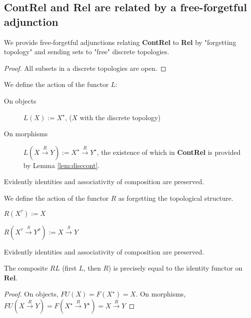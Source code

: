 \begin{fullwidth}
\subsection{\textbf{ContRel} and \textbf{Rel} are related by a free-forgetful adjunction}

We provide free-forgetful adjunctions relating \textbf{ContRel} to \textbf{Rel} by "forgetting topology" and sending sets to "free" discrete topologies.


\begin{lemma}\label{lem:disccont}
\begin{proof}
All subsets in a discrete topologies are open.
\end{proof}
\end{lemma}

\begin{defn} We define the action of the functor $L$:
\begin{description}
\item[On objects] $L(X) := X^\star$, ($X$ with the discrete topology)
\item[On morphisms] $L(X \overset{R}{\rightarrow} Y) := X^\star \overset{R}{\rightarrow} Y^\star$, the existence of which in \textbf{ContRel} is provided by Lemma \ref{lem:disccont}.
\end{description}
Evidently identities and associativity of composition are preserved.
\end{defn}

\begin{defn}
\begin{description} We define the action of the functor $R$ as forgetting the topological structure.
\item[On objects] $R(X^\tau) := X$
\item[On morphisms] $R(X^\tau \overset{S}{\rightarrow} Y^\sigma) := X \overset{S}{\rightarrow} Y$
\end{description}
Evidently identities and associativity of composition are preserved.
\end{defn}


\begin{lemma}[$RL = 1_{\textbf{Rel}}$]\label{lem:idadj}
The composite $RL$ (first $L$, then $R$) is precisely equal to the identity functor on $\mathbf{Rel}$.
\begin{proof}
On objects, $FU(X) = F(X^\star) = X$. On morphisms, $FU(X \overset{R}{\rightarrow} Y) = F(X^\star \overset{R}{\rightarrow} Y^\star) = X \overset{R}{\rightarrow} Y$
\end{proof}
\end{lemma}


\end{fullwidth}
